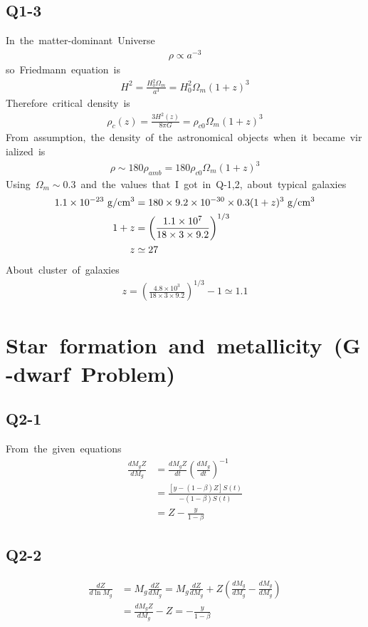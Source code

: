 \subsection{Q1-3}
In\ the\ matter-dominant\ Universe
\begin{align*}
    \rho\propto a^{-3}
\end{align*}
so\ Friedmann\ equation\ is
\begin{align*}
    H^2=\frac{H_0^2\Omega_m}{a^3}=H_0^2\Omega_m(1+z)^3
\end{align*}
Therefore\ critical\ density\ is
\begin{align*}
    \rho_c(z)=\frac{3H^2(z)}{8\pi G}=\rho_{c0}\Omega_m(1+z)^3
\end{align*}
From\ assumption,\ the\ density\ of\ the\ astronomical\ objects\ when\ it\ became\ virialized\ is
\begin{align*}
    \rho\sim180\rho_{amb}=180\rho_{c0}\Omega_m(1+z)^3
\end{align*}
Using\ $\Omega_m\sim0.3$\ and\ the\ values\ that\ I\ got\ in\ Q-1,2,\ about\ typical\ galaxies
\begin{align}
    1.1\times10^{-23}\ \rm{g/cm^3}&=180\times9.2\times10^{-30}\times0.3(1+z)^3\ \rm{g/cm^3}\nonumber\\
    1+z&=\left(\frac{1.1\times10^7}{18\times3\times9.2}\right)^{1/3}\nonumber\\
    z&\simeq27
\end{align}
About\ cluster\ of\ galaxies
\begin{align}
    z=\left(\frac{4.8\times10^3}{18\times3\times9.2}\right)^{1/3}-1\simeq1.1
\end{align}
\section{Star\ formation\ and\ metallicity\ (G-dwarf\ Problem)}
\subsection{Q2-1}
From\ the\ given\ equations
\begin{align}
    \frac{dM_gZ}{dM_g}&=\frac{dM_gZ}{dt}\left(\frac{dM_g}{dt}\right)^{-1}\nonumber\\
    &=\frac{[y-(1-\beta)Z]S(t)}{-(1-\beta)S(t)}\nonumber\\
    &=Z-\frac{y}{1-\beta}
\end{align}
\subsection{Q2-2}
\begin{align}
    \frac{dZ}{d\ln{M_g}}&=M_g\frac{dZ}{dM_g}=M_g\frac{dZ}{dM_g}+Z\left(\frac{dM_g}{dM_g}-\frac{dM_g}{dM_g}\right)\nonumber\\
    &=\frac{dM_gZ}{dM_g}-Z=-\frac{y}{1-\beta}
\end{align}
